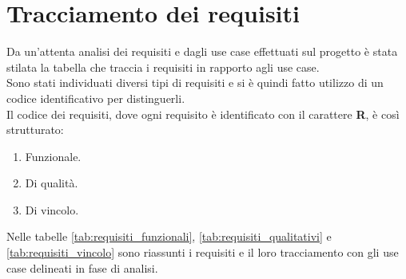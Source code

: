 \section{Tracciamento dei requisiti}
Da un'attenta analisi dei requisiti e dagli use case effettuati sul progetto è stata stilata la tabella che traccia i requisiti in rapporto agli use case.\\
Sono stati individuati diversi tipi di requisiti e si è quindi fatto utilizzo di un codice identificativo per distinguerli.\\
Il codice dei requisiti, dove ogni requisito è identificato con il carattere \textbf{R}, è così strutturato:
\begin{enumerate}
    \item[\textbf{F}:] Funzionale.
    \item[\textbf{Q}:] Di qualità.
    \item[\textbf{V}:] Di vincolo.
\end{enumerate}
Nelle tabelle \ref{tab:requisiti_funzionali}, \ref{tab:requisiti_qualitativi} e \ref{tab:requisiti_vincolo} sono riassunti i requisiti e il loro tracciamento con gli use case 
delineati in fase di analisi.
\newpage
